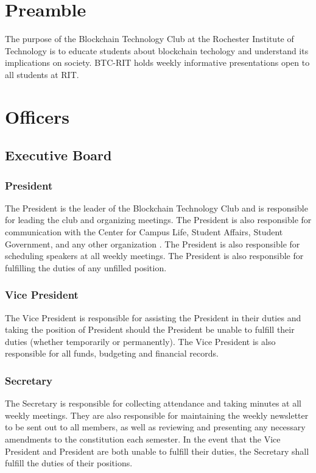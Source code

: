 \documentclass{article}
\begin{document}
\tableofcontents{}
\pagebreak
\section*{Preamble}
The purpose of the Blockchain Technology Club at the Rochester Institute of Technology is to educate students about blockchain techology and understand its implications on society.  BTC-RIT holds weekly informative presentations open to all students at RIT.
\section{Officers}\label{Officers}
\subsection{Executive Board}
\subsubsection{President}\label{President}
The President is the leader of the Blockchain Technology Club and is responsible for leading the club and organizing meetings.  The President is also responsible for communication with the Center for Campus Life, Student Affairs, Student Government, and any other organization .  The President is also responsible for scheduling speakers at all weekly meetings.  The President is also responsible for fulfilling the duties of any unfilled position.
\subsubsection{Vice President}\label{Vice President}
The Vice President is responsible for assisting the President in their duties and taking the position of President should the President be unable to fulfill their duties (whether temporarily or permanently).  The Vice President is also responsible for all funds, budgeting and financial records.
\subsubsection{Secretary}
The Secretary is responsible for collecting attendance and taking minutes at all weekly meetings.  They are also responsible for maintaining the weekly newsletter to be sent out to all members, as well as reviewing and presenting any necessary amendments to the constitution each semester.  In the event that the Vice President and President are both unable to fulfill their duties, the Secretary shall fulfill the duties of their positions.
\end{document}
